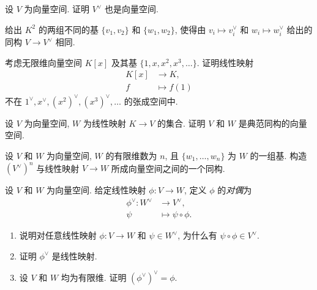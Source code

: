 \BookExerciseHeading
\begin{BookExercises}
  \item\label{ex:dual-is-vector-space} 设 $V$ 为向量空间. 证明 $V^{\vee}$ 也是向量空间.
  \item\label{ex:distinct-bases-may-give-same-duality-isomorphism} 给出 $K^{2}$ 的两组不同的基 $\{v_{1},v_{2}\}$ 和 $\{w_{1},w_{2}\}$, 使得由 $v_{i}\mapsto v_{i}^{\vee}$ 和 $w_{i}\mapsto w_{i}^{\vee}$ 给出的同构 $V\to V^{\vee}$ 相同.
  \item\label{ex:infinite-dimensional-dual-basis-failure} 考虑无限维向量空间 $K[x]$ 及其基 $\{1,x,x^{2},x^{3},\ldots\}$. 证明线性映射
  \[
    \begin{aligned}
      K[x]&\to K,\\
      f&\mapsto f(1)
    \end{aligned}
  \]
  不在 $1^{\vee},x^{\vee},(x^{2})^{\vee},(x^{3})^{\vee},\ldots$ 的张成空间中.
  \item\label{ex:linear-maps-from-base-field} 设 $V$ 为向量空间, $W$ 为线性映射 $K\to V$ 的集合. 证明 $V$ 和 $W$ 是典范同构的向量空间.
  \item\label{ex:linear-maps-into-finite-dimensional-vector-space} 设 $V$ 和 $W$ 为向量空间, $W$ 的有限维数为 $n$, 且 $\{w_{1},\ldots,w_{n}\}$ 为 $W$ 的一组基. 构造 $(V^{\vee})^{n}$ 与线性映射 $V\to W$ 所成向量空间之间的一个同构.
  \item\label{ex:dual-and-double-dual-of-linear-map} 设 $V$ 和 $W$ 为向量空间. 给定线性映射 $\phi:V\to W$, 定义 $\phi$ 的\emph{对偶}为
  \[
    \begin{aligned}
      \phi^{\vee}:W^{\vee}&\to V^{\vee},\\
      \psi&\mapsto\psi\circ\phi.
    \end{aligned}
  \]
  \begin{enumerate}
    \item 说明对任意线性映射 $\phi:V\to W$ 和 $\psi\in W^{\vee}$, 为什么有 $\psi\circ\phi\in V^{\vee}$.
    \item 证明 $\phi^{\vee}$ 是线性映射.
    \item 设 $V$ 和 $W$ 均为有限维. 证明 $(\phi^{\vee})^{\vee}=\phi$.
  \end{enumerate}
\end{BookExercises}
